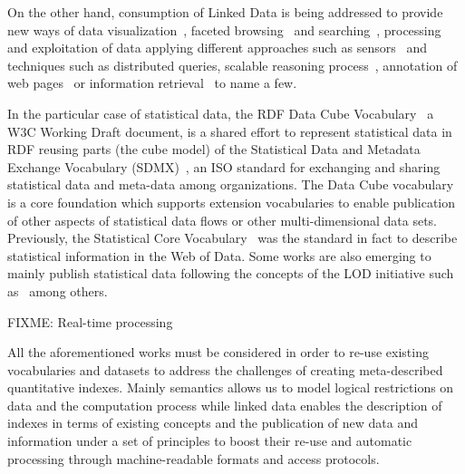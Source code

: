 On the other hand, consumption of Linked Data is being addressed to provide new ways of data visualization~\cite{DBLP:journals/semweb/DadzieR11}, 
faceted browsing~\cite{Pietriga06fresnel} and searching~\cite{hoga-etal-2011-swse-JWS}, processing~\cite{Harth:2011:SIP:1963192.1963318} and exploitation of data applying 
different approaches such as sensors~\cite{Jeung:2010:EMM:1850003.1850235,ontology-search} and techniques  such as distributed 
queries\cite{Hartig09executingsparql}, scalable reasoning process~\cite{DBLP:conf/semweb/UrbaniKOH09,DBLP:conf/semweb/HoganPPD10}, 
annotation of web pages~\cite{rdfa-primer} or information retrieval~\cite{Pound} to name a few.

In the particular case of statistical data, the RDF Data Cube Vocabulary~\cite{rdf-data-cube}
a W3C Working Draft document, is a shared effort to represent statistical data in RDF reusing parts (the cube model) 
of the Statistical Data and Metadata Exchange Vocabulary (SDMX)~\cite{sdmx}, an ISO standard 
for exchanging and sharing statistical data and meta-data among organizations. The Data Cube vocabulary is a core 
foundation which supports extension vocabularies to enable publication of other aspects of statistical data flows or 
other multi-dimensional data sets. Previously, the Statistical Core Vocabulary~\cite{scovo} was the standard in fact to describe statistical information in the Web of Data.
Some works are also emerging to mainly publish statistical data following the concepts of the LOD initiative 
such as~\cite{DBLP:conf/semweb/ZapilkoM11,DBLP:journals/ijsc/SalasMBCMA12,DDI2013,DBLP:conf/dgo/FernandezMG11,webindexlod} 
among others.


FIXME: Real-time processing


All the aforementioned works must be considered in order to re-use existing vocabularies and datasets to address 
the challenges of creating meta-described quantitative indexes. Mainly semantics allows us to model logical restrictions 
on data and the computation process while linked data enables the description of indexes in terms of existing concepts and 
the publication of new data and information under a set of principles to boost their re-use and automatic 
processing through machine-readable formats and access protocols.